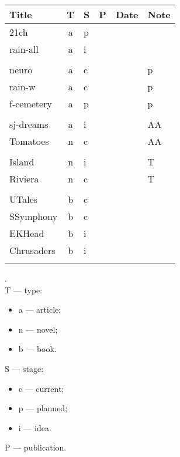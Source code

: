 \documentclass[a4paper,12pt]{article} %
\begin{document}
	
\begin{tabularx}{\textwidth}{|l|c|l|l|c|X|}
	\hline
	Title & T & S & P & Date & Note \\
	\hline
	21ch & a & p &  &  &  \\
	\hline
	rain-all & a & i &  &  &  \\
	\hline
	&  &  &  &  &  \\
	\hline
	neuro & a & c &  &  & p \\
	\hline
	rain-w & a & c &  &  & p \\
	\hline
	f-cemetery & a & p &  &  & p \\
	\hline
	&  &  &  &  &  \\
	\hline
	sj-dreams & a & i &  &  & AA \\
	\hline
	Tomatoes & n & c &  &  & AA \\
	\hline
	&  &  &  &  &  \\
	\hline
	Island & n & i &  &  & T \\
	\hline
	Riviera & n & c &  &  & T \\
	\hline
	&  &  &  &  &  \\
	\hline
	UTales & b & c &  &  &  \\
	\hline
	SSymphony & b & c &  &  &  \\
	\hline
	EKHead & b & i &  &  &  \\
	\hline
	Chrusaders & b & i &  &  &  \\
	\hline
	&  &  &  &  &  \\
	\hline
\end{tabularx}

.\\

T --- type:
\begin{itemize}
	\item a --- article;
	\item n --- novel;
	\item b --- book.\\
\end{itemize}

S --- stage:
\begin{itemize}
	\item c --- current;
	\item p --- planned;
	\item i --- idea.\\
\end{itemize}

P --- publication.

\end{document}
